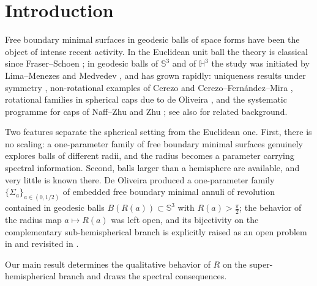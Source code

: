 \documentclass[11pt,a4paper]{amsart}
\theoremstyle{plain}
\theoremstyle{definition}
\newcommand{\Sph}{\mathbb{S}}
\newcommand{\Hyp}{\mathbb{H}}
\begin{document}
\section{Introduction}\label{sec:intro}

Free boundary minimal surfaces in geodesic balls of space forms have been the object of intense recent activity. In the Euclidean unit ball the theory is classical since Fraser--Schoen \cite{FS16}; in geodesic balls of $\Sph^3$ and of $\Hyp^3$ the study was initiated by Lima--Menezes \cite{LM23} and Medvedev \cite{Med23}, and has grown rapidly: uniqueness results under symmetry \cite{Lim25}, non-rotational examples of Cerezo \cite{Cer25} and Cerezo--Fern\'andez--Mira \cite{CFM25}, rotational families in spherical caps due to de Oliveira \cite{dO24}, and the systematic programme for caps of Naff--Zhu \cite{NZ1} and Zhu \cite{NZ2}; see also \cite{NZhalf,FS15,FL14,KM} for related background.

Two features separate the spherical setting from the Euclidean one. First, there is no scaling: a one-parameter family of free boundary minimal surfaces genuinely explores balls of different radii, and the radius becomes a parameter carrying spectral information. Second, balls larger than a hemisphere are available, and very little is known there. De Oliveira \cite[Prop. 3.4]{dO24} produced a one-parameter family $\{\Sigma_a\}_{a\in(0,1/2)}$ of embedded free boundary minimal annuli of revolution contained in geodesic balls $B(R(a))\subset\Sph^3$ with $R(a)>\tfrac\pi2$; the behavior of the radius map $a\mapsto R(a)$ was left open, and its bijectivity on the complementary sub-hemispherical branch is explicitly raised as an open problem in \cite[Rem. 3.5]{dO24} and revisited in \cite[\S 6.1]{NZ1}.

Our main result determines the qualitative behavior of $R$ on the super-hemispherical branch and draws the spectral consequences.
\end{document}
